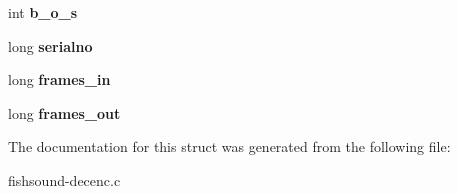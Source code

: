 \begin{DoxyCompactItemize}
\item 
int {\bfseries b\-\_\-o\-\_\-s}\label{structFS__DecEnc_a97e671e05484152af5cb9ef15c12f326}

\item 
long {\bfseries serialno}\label{structFS__DecEnc_a29c30cd0d4f27593f46baa093090c796}

\item 
long {\bfseries frames\-\_\-in}\label{structFS__DecEnc_ac5ae45affea8c8eb37d9cd0bbb1e90c1}

\item 
long {\bfseries frames\-\_\-out}\label{structFS__DecEnc_aa418b3a09dd310193bb7e4d7d4d69445}

\end{DoxyCompactItemize}


\-The documentation for this struct was generated from the following file\-:\begin{DoxyCompactItemize}
\item 
fishsound-\/decenc.\-c\end{DoxyCompactItemize}
